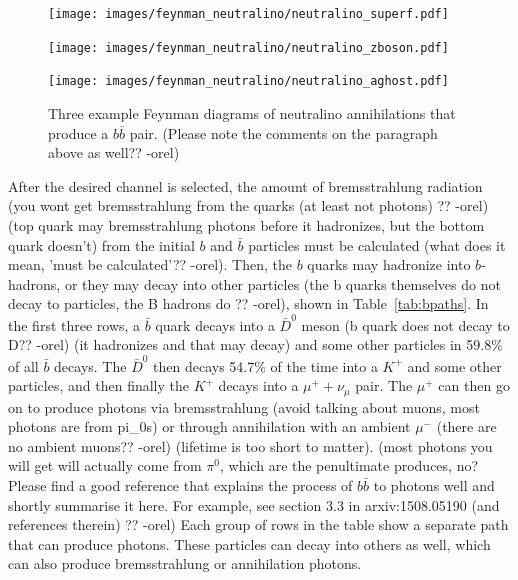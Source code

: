    \begin{figure}[h]
      \centering
      \hfill
      \begin{minipage}{0.17\textwidth}\texttt{[image: images/feynman\_neutralino/neutralino\_superf.pdf]}\end{minipage}\hfill
      \begin{minipage}{0.25\textwidth}\texttt{[image: images/feynman\_neutralino/neutralino\_zboson.pdf]}\end{minipage}\hfill
      \begin{minipage}{0.25\textwidth}\texttt{[image: images/feynman\_neutralino/neutralino\_aghost.pdf]}\end{minipage}\hfill
      \hfill
      \caption[WIMP Annihilation Feynman Diagrams]{
        Three example Feynman diagrams of neutralino annihilations that produce a $b\bar{b}$ pair.
        {\color{red}(Please note the comments on the paragraph above as well?? -orel)}
      }
      \label{fig:neutralino_feynman}
    \end{figure}

    After the desired channel is selected, the amount of {\color{red}bremsstrahlung radiation (you wont get bremsstrahlung from the quarks (at least not photons) ?? -orel) (top quark may bremsstrahlung photons before it hadronizes, but the bottom quark doesn't)} from the initial $b$ and $\bar{b}$ particles {\color{red}must be calculated (what does it mean, 'must be calculated'?? -orel)}.
    Then, the $b$ quarks may hadronize into $b$-hadrons, or {\color{red}they may decay into other particles (the b quarks themselves do not decay to particles, the B hadrons do ?? -orel)}, shown in Table~\ref{tab:bpaths}.
    In the first three rows, a $\bar{b}$ quark decays into a $\bar{D}^0$ meson {\color{red}(b quark does not decay to D?? -orel) (it hadronizes and that may decay)} and some other particles in 59.8\% of all $\bar{b}$ decays.
    The $\bar{D}^0$ then decays 54.7\% of the time into a $K^+$ and some other particles, and then finally the $K^+$ decays into a $\mu^+ + \nu_{\mu}$ pair.
    The $\mu^+$ can then go on to produce photons via bremsstrahlung {\color{red}(avoid talking about muons, most photons are from pi_0s)} or through annihilation with an ambient $\mu^-$ {\color{red}(there are no ambient muons?? -orel) (lifetime is too short to matter)}.
    {\color{red}(most photons you will get will actually come from $\pi^0$, which are the penultimate produces, no?  Please find a good reference that explains the process of $b\bar{b}$ to photons well and shortly summarise it here.  For example, see section 3.3 in arxiv:1508.05190 (and references therein) ?? -orel)}
    Each group of rows in the table show a separate path that can produce photons.
    These particles can decay into others as well, which can also produce bremsstrahlung or annihilation photons.
    
